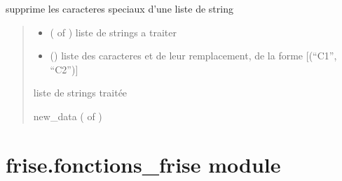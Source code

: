 \documentclass[letterpaper,10pt,english]{sphinxmanual}
\begin{document}

\begin{fulllineitems}
\label{\detokenize{frise:frise.ecriture_fichier.format}}
\pysigstartsignatures
{}
\pysigstopsignatures
\sphinxAtStartPar
supprime les caracteres speciaux d’une liste de string
\begin{quote}\begin{description}
\begin{itemize}
\item {} 
\sphinxAtStartPar
{} ( of ) \textendash{} liste de strings a traiter

\item {} 
\sphinxAtStartPar
{} () \textendash{} liste des caracteres et de leur remplacement, de la forme {[}(“C1”, “C2”){]}

\end{itemize}

\sphinxAtStartPar
liste de strings traitée

\sphinxAtStartPar
new\_data ( of )

\end{description}\end{quote}

\end{fulllineitems}



\section{frise.fonctions\_frise module}
\label{\detokenize{frise:module-frise.fonctions_frise}}\label{\detokenize{frise:frise-fonctions-frise-module}}
\end{document}
